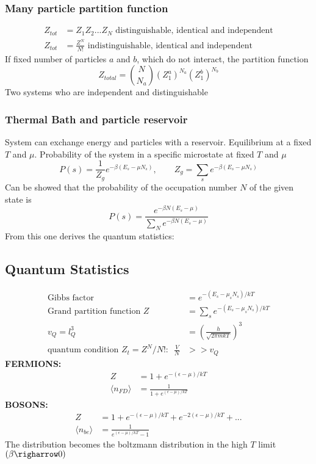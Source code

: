 \documentclass[a4paper, norsk, 8pt]{article}
\begin{document}
\begin{multicols*}{3}
\subsubsection*{\scriptsize Many particle partition function}
\begin{align*}
  Z_{tot} &= Z_1Z_2...Z_N\,\, \text{distinguishable, identical and independent}\\
  Z_{tot} &= \frac{Z^N}{N!}\,\, \text{indistinguishable, identical and independent }
\end{align*}
If fixed number of particles $a$ and $b$, which do not interact, the partition function
\begin{equation*}
  Z_{total} = \binom{N}{N_a}(Z_1^a)^{N_a}(Z_1^b)^{N_b}
\end{equation*}
Two systems who are independent and distinguishable
$$ $$
\subsubsection*{\scriptsize Thermal Bath and particle reservoir}
System can exchange energy and particles with a reservoir. Equilibrium at a fixed $T$ and $\mu$. Probability of the system in a specific microstate at fixed $T$ and $\mu$
\begin{equation*}
  P(s) = \frac{1}{Z_g}e^{-\beta \left( E_s-\mu N_s \right)}, \qquad Z_g = \sum_s e^{-\beta \left(E_s-\mu N_s \right) }
\end{equation*}
Can be showed that the probability of the occupation number $N$ of the given state is
\begin{equation*}
  P(s) = \frac{e^{-\beta N \left( E_s-\mu  \right)}}{\sum_{N} e^{-\beta N \left( E_s-\mu  \right)}}
\end{equation*}
From this one derives the quantum statistics:
\subsection*{\footnotesize  Quantum Statistics}
\begin{align*}
    \text{Gibbs factor} &= e^{-(E_s - \mu_{s} N_{s})/kT} \\
    \text{Grand partition function}\,\, Z &= \sum_s e^{-(E_s - \mu_s N_s)/kT} \\
    v_Q = l_Q^3 &= \left( \frac{h}{\sqrt{2\pi mkT}} \right)^3 \\
    \text{quantum condition $Z_t=Z^N/N!$:}\,\,\,\, \frac{V}{N} &>> v_Q
\end{align*}
\textbf{\textsc{FERMIONS:}}
\begin{align*}
    Z &= 1 + e^{-(\epsilon-\mu)/kT} \\
    \langle n_{FD} \rangle &= \frac{1}{1+e^{(\epsilon-\mu)/kT}}
\end{align*}
\textbf{\textsc{BOSONS:}}
\begin{align*}
    Z &= 1 + e^{-(\epsilon-\mu)/kT} + e^{-2(\epsilon-\mu)/kT} + ... \\
    \langle n_{be} \rangle &= \frac{1}{e^{(\epsilon-\mu)/kT}-1}
\end{align*}
The distribution becomes the boltzmann distribution in the high $T$ limit $(\beta \righarrow 0 )$

\end{multicols*}
\end{document}
